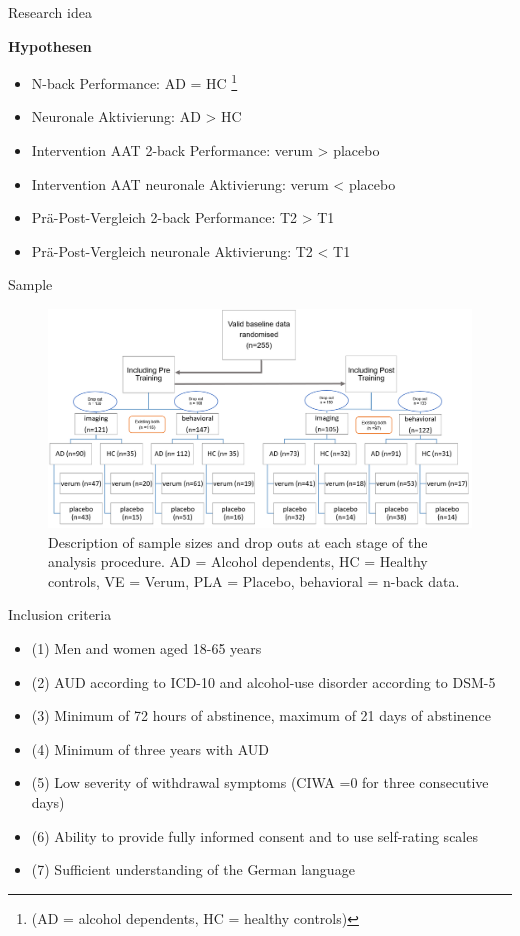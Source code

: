 \documentclass{bredelebeamer}
\begin{document}
\begin{frame}{Research idea}
\begin{block}{\textbf{Hypothesen}}
{\begin{itemize}
\item \small N-back Performance: AD = HC \footnote{\footnotesize{(AD = alcohol dependents, HC = healthy controls)\cite{Charlet.2014}}}
\item \small Neuronale Aktivierung: AD > HC
\item \small Intervention AAT 2-back Performance: verum > placebo
\item \small Intervention AAT neuronale Aktivierung: verum < placebo
\item \small Prä-Post-Vergleich 2-back Performance: T2 > T1
\item \small Prä-Post-Vergleich neuronale Aktivierung: T2 < T1
\end{itemize}}
\end{block}
\end{frame}


\begin{frame}{Sample}
\begin{figure}
    \includegraphics[scale=0.44]{images/Sample.PNG}
    \caption{\tiny{Description of sample sizes and drop outs at each stage of the analysis procedure. AD = Alcohol dependents, HC = Healthy controls, VE = Verum, PLA = Placebo, behavioral = n-back data.}}
\end{figure}
\end{frame}


\begin{frame}{Inclusion criteria}
\begin{itemize}
    \item (1)	Men and women aged 18-65 years
\item (2)	AUD according to ICD-10 and alcohol-use disorder according to DSM-5
\item (3)	Minimum of 72 hours of abstinence, maximum of 21 days of abstinence
\item (4)	Minimum of three years with AUD
\item (5)	Low severity of withdrawal symptoms (CIWA =0 for three consecutive days)
\item (6)	Ability to provide fully informed consent and to use self-rating scales
\item (7)	Sufficient understanding of the German language
\end{itemize}
\end{frame}
\end{document}
